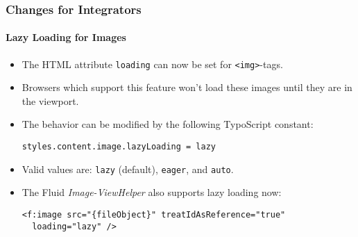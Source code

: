 
\begin{frame}[fragile]
	\frametitle{Changes for Integrators}
	\framesubtitle{Lazy Loading for Images}

	\lstset{basicstyle=\smaller\ttfamily}

	\begin{itemize}
		\item The HTML attribute \texttt{loading} can now be set for \texttt{<img>}-tags.
		\item Browsers which support this feature won't load these images until they are in the viewport.
		\item The behavior can be modified by the following TypoScript constant:

\vspace{-0.4cm}
\begin{lstlisting}
styles.content.image.lazyLoading = lazy
\end{lstlisting}

		\item Valid values are: \texttt{lazy} (default), \texttt{eager}, and \texttt{auto}.
		\item The Fluid \textit{Image-ViewHelper} also supports lazy loading now:

\vspace{-0.4cm}
\begin{lstlisting}
<f:image src="{fileObject}" treatIdAsReference="true"
  loading="lazy" />
\end{lstlisting}

	\end{itemize}

\end{frame}


